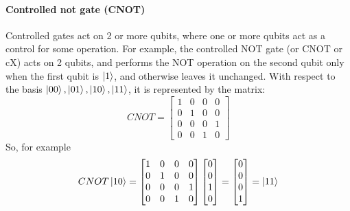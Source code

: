 \documentclass[main.tex]{subfiles}
\theoremstyle{definition}
\begin{document}
	\paragraph{Controlled not gate (CNOT)}Controlled gates act on 2 or more qubits, where one or more qubits act as a control for some operation. For example, the controlled NOT gate (or CNOT or cX) acts on 2 qubits, and performs the NOT operation on the second qubit only when the first qubit is $\ket{1}$, and otherwise leaves it unchanged. With respect to the basis $\ket{00}, \ket{01}, \ket{10}, \ket{11}$, it is represented by the matrix:
	\begin{equation}
	CNOT=
	\begin{bmatrix}
	1 & 0 & 0 & 0\\
	0 & 1 & 0 & 0\\
	0 & 0 & 0 & 1\\
	0 & 0 & 1 & 0
	\end{bmatrix}
	\end{equation}
	So, for example
	$$
	CNOT\ket{10}=
	\begin{bmatrix}
	1 & 0 & 0 & 0\\
	0 & 1 & 0 & 0\\
	0 & 0 & 0 & 1\\
	0 & 0 & 1 & 0
	\end{bmatrix}
	\begin{bmatrix}
	0 \\
	0 \\
	1 \\
	0
	\end{bmatrix}
	= 
	\begin{bmatrix}
	0 \\
	0 \\
	0 \\
	1
	\end{bmatrix}
	=
	\ket{11}
	$$
	
	
\end{document}
